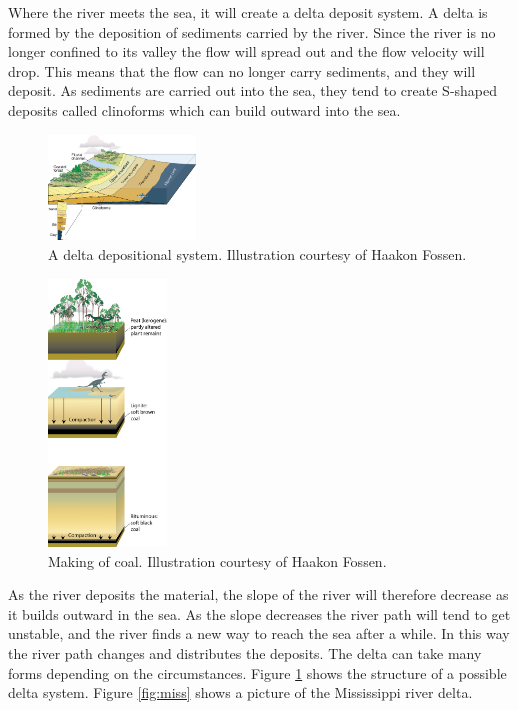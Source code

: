 \documentclass[a4paper,12pt]{report}
\begin{document}
Where the river meets the sea, it will create a delta deposit system. A delta is formed by the deposition of sediments carried by the river. Since the river is no longer confined to its valley the flow will spread out and the flow velocity will drop. 
This means that the flow can no longer carry sediments, and they will deposit. As sediments are carried out into the sea, they tend to create S-shaped deposits called clinoforms which can build outward into the sea.
\begin{figure}
 \centering

    \includegraphics[width=0.35\textwidth]{thesis/geo/english/Delta3D.jpg}
  
  \caption{A delta depositional system. Illustration courtesy of Haakon Fossen.}
  \label{fig:delta}
\end{figure}


\begin{figure}
  \begin{center}
   \vspace{-15pt}
    \includegraphics[width=0.28\textwidth]{thesis/geo/english/coal.jpg}
  \end{center}
   \vspace{-15pt}
  \caption{Making of coal. Illustration courtesy of Haakon Fossen.}
  \label{fig:coal}
\end{figure}
As the river deposits the material, the slope of the river will therefore decrease as it builds outward in the sea. As the slope decreases the river path will tend to get unstable, and the river finds a new way to reach the sea after a while. In this way the river path changes and distributes the deposits. The delta can take many forms depending on the circumstances. Figure \ref{fig:delta} shows the structure of a possible delta system. Figure \ref{fig:miss} shows a picture of the Mississippi river delta.
\end{document}
